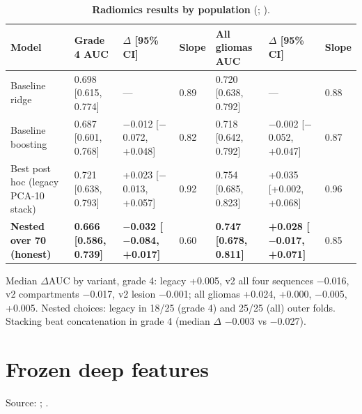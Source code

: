 \documentclass[11pt,a4paper]{article}
\begin{document}
\begin{landscape}
\begin{table}[H]
\centering
\small
\renewcommand{\thetable}{S9}\renewcommand{\theHtable}{S9}
\caption{\textbf{Radiomics results by population} (;
).}
\label{tab:S9}
\begin{tabularx}{\linewidth}{@{}L R{3.6cm} R{4.3cm} R{1.0cm} R{3.6cm} R{4.3cm} R{1.0cm}@{}}
\toprule
Model & Grade 4 AUC & $\Delta$ [95\% CI] & Slope & All gliomas AUC & $\Delta$ [95\% CI] & Slope \\
\midrule
Baseline ridge & 0.698 [0.615, 0.774] & --- & 0.89 & 0.720 [0.638, 0.792] & --- & 0.88 \\
Baseline boosting & 0.687 [0.601, 0.768] & $-$0.012 [$-$0.072, +0.048] & 0.82 & 0.718 [0.642, 0.792] & $-$0.002 [$-$0.052, +0.047] & 0.87 \\
Best post hoc (legacy PCA-10 stack) & 0.721 [0.638, 0.793] & +0.023 [$-$0.013, +0.057] & 0.92 & 0.754 [0.685, 0.823] & +0.035 [+0.002, +0.068] & 0.96 \\
\textbf{Nested over 70 (honest)} & \textbf{0.666 [0.586, 0.739]} & \textbf{$-$0.032 [$-$0.084, +0.017]} & 0.60 & \textbf{0.747 [0.678, 0.811]} & \textbf{+0.028 [$-$0.017, +0.071]} & 0.85 \\
\bottomrule
\end{tabularx}
\end{table}
\end{landscape}

Median $\Delta$AUC by variant, grade 4: legacy +0.005, v2 all four sequences $-$0.016, v2 compartments
$-$0.017, v2 lesion $-$0.001; all gliomas +0.024, +0.000, $-$0.005, +0.005. Nested choices: legacy in 18/25
(grade 4) and 25/25 (all) outer folds. Stacking beat concatenation in grade 4 (median $\Delta$ $-$0.003 vs
$-$0.027).

\FloatBarrier
\section{Frozen deep features}\label{sec:S6}

Source: ;
.
\end{document}
